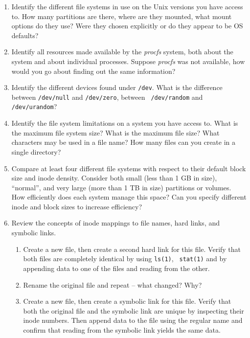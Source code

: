 \begin{enumerate}
\item
Identify the different file systems in use on the Unix
versions you have access to.  How many partitions are
there, where are they mounted, what mount options do
they use?  Were they chosen explicitly or do they
appear to be OS defaults?

\item
Identify all resources made available by the {\em procfs} system, both
about the system and about individual processes.  Suppose {\em procfs} was
not available, how would you go about finding out the same information?

\item
Identify the different devices found under {\tt /dev}.  What is the
difference between {\tt /dev/null} and {\tt /dev/zero}, between {\tt
/dev/random} and {\tt /dev/urandom}?

\item
Identify the file system limitations on a system you have access to.  What
is the maximum file system size?  What is the maximum file size?  What
characters may be used in a file name?  How many files can you create in a
single directory?

\item
Compare at least four different file systems with respect to their default
block size and inode density.  Consider both small (less than 1 GB in
size), ``normal'', and very large (more than 1 TB in size) partitions or
volumes.  How efficiently does each system manage this space?  Can you
specify different inode and block sizes to increase efficiency?

\item
Review the concepts of inode mappings to file names, hard links, and
symbolic links.

\begin{enumerate}

\item
Create a new file, then create a second hard link for this file.  Verify
that both files are completely identical by using {\tt ls(1)}, {\tt
stat(1)} and by appending data to one of the files and reading from the
other.

\item
Rename the original file and repeat -- what changed?  Why?

\item
Create a new file, then create a symbolic link for this file.  Verify that
both the original file and the symbolic link are unique by inspecting
their inode numbers.  Then append data to the file using the regular name
and confirm that reading from the symbolic link yields the same data.


\end{enumerate}
\end{enumerate}
